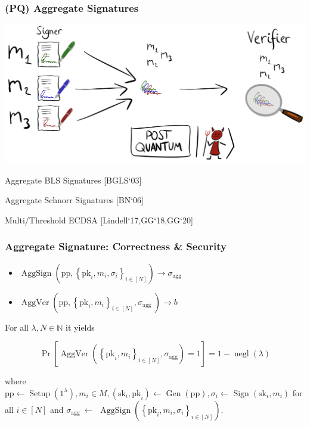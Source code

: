 \documentclass{beamer}
\begin{document}
\begin{frame}

\frametitle{(PQ) Aggregate Signatures}
\includegraphics[scale=0.3]{aggsig.png}

Aggregate BLS Signatures [BGLS`03]

Aggregate Schnorr Signatures [BN`06]

Multi/Threshold ECDSA [Lindell`17,GG`18,GG`20]

\end{frame}

\begin{frame}
\frametitle{Aggregate Signature: Correctness \& Security}
\begin{itemize}
	\item $\operatorname{AggSign}\left(\mathrm{pp},\left\{\mathrm{pk}_i, m_i, \sigma_i\right\}_{i \in[N]}\right) \rightarrow \sigma_{\text {agg }}$ 
	\item $\operatorname{AggVer}\left(\mathrm{pp},\left\{\mathrm{pk}_i, m_i\right\}_{i \in[N]}, \sigma_{\text {agg }}\right) \rightarrow b$
\end{itemize}

\begin{definition}[Correctness]
	For all $\lambda, N \in \mathbb{N}$ it yields

$$
\operatorname{Pr}\left[\operatorname{AggVer}\left(\left\{\mathrm{pk}_i, m_i\right\}_{i \in[N]}, \sigma_{\mathrm{agg}}\right)=1\right]=1-\operatorname{negl}(\lambda)
$$

where $\mathrm{pp} \leftarrow \operatorname{Setup}\left(1^\lambda\right), m_i \in M,\left(\mathrm{sk}_i, \mathrm{pk}_i\right) \leftarrow \operatorname{Gen}(\mathrm{pp}), \sigma_i \leftarrow \operatorname{Sign}\left(\mathrm{sk}_i, m_i\right)$ for all $i \in[N]$ and $\sigma_{\text {agg }} \leftarrow$ $\operatorname{AggSign}\left(\left\{\mathrm{pk}_i, m_i, \sigma_i\right\}_{i \in[N]}\right)$.
\end{definition}

	
\end{frame}
\end{document}
